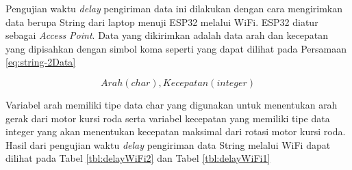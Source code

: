 Pengujian waktu \emph{delay} pengiriman data ini dilakukan dengan cara mengirimkan data berupa String dari laptop menuji ESP32 melalui WiFi. ESP32 diatur sebagai \emph{Access Point}. Data yang dikirimkan adalah data arah dan kecepatan yang dipisahkan dengan simbol koma seperti yang dapat dilihat pada Persamaan \ref{eq:string-2Data}

\begin{equation}
  \label{eq:string-2Data}
    Arah(char),Kecepatan(integer)
\end{equation}

Variabel arah memiliki tipe data char yang digunakan untuk menentukan arah gerak dari motor kursi roda serta variabel kecepatan yang memiliki tipe data integer yang akan menentukan kecepatan maksimal dari rotasi motor kursi roda. Hasil dari pengujian waktu \emph{delay} pengiriman data String melalui WiFi dapat dilihat pada Tabel \ref{tbl:delayWiFi2} dan Tabel \ref{tbl:delayWiFi1}

